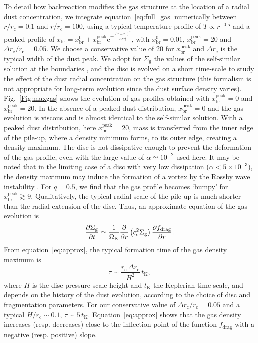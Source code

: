 \documentclass[a4paper,fleqn,usenatbib]{mnras}
\begin{document}
To detail how backreaction modifies the gas structure at the location of a radial dust concentration, we integrate equation~\ref{eq:full_gas} numerically between $r/r_\mathrm{c} = 0.1$ and $r/r_\mathrm{c} = 100$, using a typical temperature profile of $T \propto r^{-0.5}$ and a peaked profile of $x_\mathrm{br}=x_\mathrm{br}^0+x_\mathrm{br}^\mathrm{peak}\mathrm{e}^{-\frac{(r-r_\mathrm{c})^2}{2\Delta r_\mathrm{c}^2}}$, with $x_\mathrm{br}^0 = 0.01$, $x_\mathrm{br}^\mathrm{peak} = 20$ and $\Delta r_\mathrm{c}/r_\mathrm{c} = 0.05$. We choose a conservative value of 20 for $x_\mathrm{br}^\mathrm{peak}$ and $\Delta r_\mathrm{c}$ is the typical width of the dust peak. We adopt for $\Sigma_\mathrm{g}$ the values of the self-similar solution at the boundaries \citep{LBP1974}, and the disc is evolved on a short time-scale to study the effect of the dust radial concentration on the gas structure (this formalism is not appropriate for long-term evolution since the dust surface density varies). Fig.~\ref{Fig:maxgas} shows the evolution of gas profiles obtained with $x_\mathrm{br}^\mathrm{peak}=0$ and $x_\mathrm{br}^\mathrm{peak}=20$. In the absence of a peaked dust distribution, $x_\mathrm{br}^\mathrm{peak}=0$ and the gas evolution is viscous and is almost identical to the self-similar solution. With a peaked dust distribution, here $x_\mathrm{br}^\mathrm{peak}=20$, mass is transferred from the inner edge of the pile-up, where a density minimum forms, to its outer edge, creating a density maximum. The disc is not dissipative enough to prevent the deformation of the gas profile, even with the large value of $\alpha\simeq10^{-2}$ used here. It may be noted that in the limiting case of a disc with very low dissipation ($\alpha<5\times10^{-3}$), the density maximum may induce the formation of a vortex by the Rossby wave instability \citep{Zhu2014}. For $q = 0.5$, we find that the gas profile becomes `bumpy' for $x_\mathrm{br}^\mathrm{peak}\gtrsim9$. Qualitatively, the typical radial scale of the pile-up is much shorter than the radial extension of the disc. Thus, an approximate equation of the gas evolution is
%
\begin{equation}
\frac{\partial \Sigma_\mathrm{g}}{\partial t}  \simeq \frac{1}{\Omega_\mathrm{K}} \frac{\partial}{\partial r} \left( c_{\rm s}^{2} \Sigma_\mathrm{g} \right) \frac{\partial f_{\rm drag}}{\partial r} .
\label{eq:approx}
\end{equation}
%
From equation~\ref{eq:approx}, the typical formation time of the gas density maximum is
%
\begin{equation}
\tau\sim\frac{r_\mathrm{c}\,\Delta r_\mathrm{c}}{H^2}\,t_\mathrm{K},
\label{eq:tau}
\end{equation}
%
where $H$ is the disc pressure scale height and $t_\mathrm{K}$ the Keplerian time-scale, and depends on the history of the dust evolution, according to the choice of disc and fragmentation parameters. For our conservative value of $\Delta r_\mathrm{c}/r_\mathrm{c}=0.05$ and a typical $H/r_\mathrm{c}\sim0.1$, $\tau\sim5\,t_\mathrm{K}$. Equation~\ref{eq:approx} shows that the gas density increases (resp. decreases) close to the inflection point of the function $f_\mathrm{drag}$ with a negative (resp. positive) slope.
\end{document}
